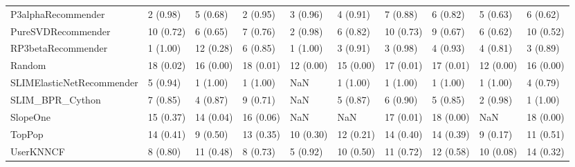 \begin{tabular}{llllllllll}
                 P3alphaRecommender &                 2 (0.98) &    5 (0.68) &      2 (0.95) &     3 (0.96) &             4 (0.91) &            7 (0.88) &          6 (0.82) &           5 (0.63) &          6 (0.62) \\
                 PureSVDRecommender &                10 (0.72) &    6 (0.65) &      7 (0.76) &     2 (0.98) &             6 (0.82) &           10 (0.73) &          9 (0.67) &           6 (0.62) &         10 (0.52) \\
                 RP3betaRecommender &                 1 (1.00) &   12 (0.28) &      6 (0.85) &     1 (1.00) &             3 (0.91) &            3 (0.98) &          4 (0.93) &           4 (0.81) &          3 (0.89) \\
                             Random &                18 (0.02) &   16 (0.00) &     18 (0.01) &    12 (0.00) &            15 (0.00) &           17 (0.01) &         17 (0.01) &          12 (0.00) &         16 (0.00) \\
          SLIMElasticNetRecommender &                 5 (0.94) &    1 (1.00) &      1 (1.00) &          NaN &             1 (1.00) &            1 (1.00) &          1 (1.00) &           1 (1.00) &          4 (0.79) \\
                    SLIM\_BPR\_Cython &                 7 (0.85) &    4 (0.87) &      9 (0.71) &          NaN &             5 (0.87) &            6 (0.90) &          5 (0.85) &           2 (0.98) &          1 (1.00) \\
                           SlopeOne &                15 (0.37) &   14 (0.04) &     16 (0.06) &          NaN &                  NaN &           17 (0.01) &         18 (0.00) &                NaN &         18 (0.00) \\
                             TopPop &                14 (0.41) &    9 (0.50) &     13 (0.35) &    10 (0.30) &            12 (0.21) &           14 (0.40) &         14 (0.39) &           9 (0.17) &         11 (0.51) \\
                          UserKNNCF &                 8 (0.80) &   11 (0.48) &      8 (0.73) &     5 (0.92) &            10 (0.50) &           11 (0.72) &         12 (0.58) &          10 (0.08) &         14 (0.32) \\
\bottomrule
\end{tabular}
